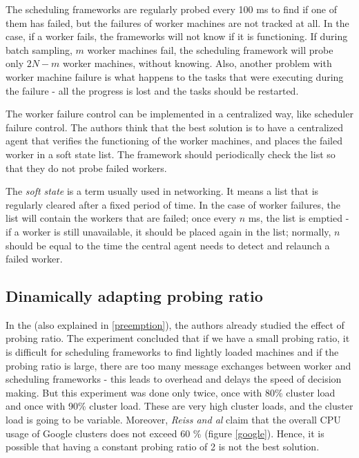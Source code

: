 \documentclass[11pt]{article}
\begin{document}
		The scheduling frameworks are regularly probed every 100 ms to find if one of them has failed, but the failures of worker machines are not tracked at all. In the case, if a worker fails, the frameworks will not know if it is functioning. If during batch sampling, $m$ worker machines fail, the scheduling framework will probe only $2N - m$ worker machines, without knowing. Also, another problem with worker machine failure is what happens to the tasks that were executing during the failure - all the progress is lost and the tasks should be restarted.
		
		The worker failure control can be implemented in a centralized way, like scheduler failure control. The authors think that the best solution is to have a centralized agent that verifies the functioning of the worker machines, and places the failed worker in a soft state list. The framework should periodically check the list so that they do not probe failed workers.
		
		The \textit{soft state} is a term usually used in networking. It means a list that is regularly cleared after a fixed period of time. In the case of worker failures, the list will contain the workers that are failed; once every $n$ ms, the list is emptied - if a worker is still unavailable, it should be placed again in the list; normally, $n$ should be equal to the time the central agent needs to detect and relaunch a failed worker.
	
	\subsection{Dinamically adapting probing ratio}
	
		In the \cite[subsection 7.9]{sparrow} (also explained in \ref{preemption}), the authors already studied the effect of probing ratio. The experiment concluded that if we have a small probing ratio, it is difficult for scheduling frameworks to find lightly loaded machines and if the probing ratio is large, there are too many message exchanges between worker and scheduling frameworks - this leads to overhead and delays the speed of decision making. But this experiment was done only twice, once with 80\% cluster load and once with 90\% cluster load. These are very high cluster loads, and the cluster load is going to be variable. Moreover, \textit{Reiss and al} \cite{hetero} claim that the overall CPU usage of Google clusters does not exceed 60 \% (figure \ref{google}). Hence, it is possible that having a constant probing ratio of 2 is not the best solution.
		
\end{document}

